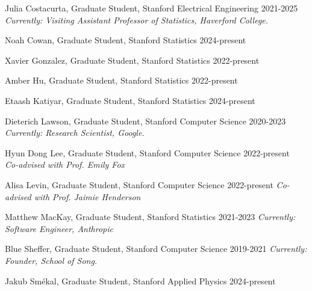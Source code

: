 \documentclass[10pt]{article}
\renewcommand{\section}[1]{\pagebreak[3]%
    \hyphenpenalty=10000%
    \vspace{1.3\baselineskip}%
    \noindent\llap{\scshape\smash{\parbox[t]{\marginparwidth}{\raggedright #1}}}%
    \vspace{-\baselineskip}\par}
\newcommand{\blankline}{\quad\pagebreak[3]}
\begin{document}
\blankline


\section{Student\\Advising}

\begin{outerlist}
  
\item Julia Costacurta, Graduate Student, Stanford Electrical Engineering \hfill {\small 2021-2025}
\textit{Currently: Visiting Assistant Professor of Statistics, Haverford College.}

\item Noah Cowan, Graduate Student, Stanford Statistics \hfill {\small 2024-present}
  
\item Xavier Gonzalez, Graduate Student, Stanford Statistics \hfill {\small 2022-present}

\item Amber Hu, Graduate Student, Stanford Statistics \hfill {\small 2022-present}

\item Etaash Katiyar, Graduate Student, Stanford Statistics \hfill {\small 2024-present}

\item Dieterich Lawson, Graduate Student, Stanford Computer Science \hfill {\small 2020-2023} \\
  \textit{Currently: Research Scientist, Google.}
  
\item Hyun Dong Lee, Graduate Student, Stanford Computer Science \hfill {\small 2022-present} \\
  \textit{Co-advised with Prof. Emily Fox}
  
\item Alisa Levin, Graduate Student, Stanford Computer Science \hfill {\small 2022-present}
  \textit{Co-advised with Prof. Jaimie Henderson}

\item Matthew MacKay, Graduate Student, Stanford Statistics \hfill {\small 2021-2023}
  \textit{Currently: Software Engineer, Anthropic}
  
\item Blue Sheffer, Graduate Student, Stanford Computer Science \hfill {\small 2019-2021}
  \textit{Currently: Founder, School of Song.}

\item Jakub Sm\'{e}kal, Graduate Student, Stanford Applied Physics \hfill {\small 2024-present}
  

\end{outerlist}
\end{document}
